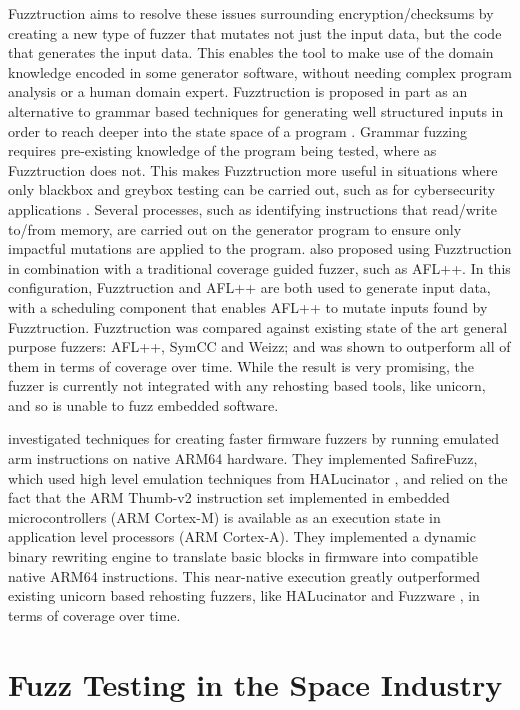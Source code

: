 \documentclass[../report.tex]{subfiles}
\begin{document}
Fuzztruction \citep{Fuzztruction_2023} aims to resolve these issues surrounding
encryption/checksums by creating a new type of fuzzer that mutates not just the
input data, but the code that generates the input data. This enables the tool
to make use of the domain knowledge encoded in some generator software, without
needing complex program analysis or a human domain expert. Fuzztruction is
proposed in part as an alternative to grammar based techniques for generating
well structured inputs in order to reach deeper into the state space of a
program \citep{Fuzztruction_2023}. Grammar fuzzing requires pre-existing
knowledge of the program being tested, where as Fuzztruction does not. This
makes Fuzztruction more useful in situations where only blackbox and greybox
testing can be carried out, such as for cybersecurity applications
\citep{Fuzztruction_2023}. Several processes, such as identifying instructions
that read/write to/from memory, are carried out on the generator program to
ensure only impactful mutations are applied to the program.
\citet{Fuzztruction_2023} also proposed using Fuzztruction in combination with
a traditional coverage guided fuzzer, such as AFL++. In this configuration,
Fuzztruction and AFL++ are both used to generate input data, with a scheduling
component that enables AFL++ to mutate inputs found by Fuzztruction.
Fuzztruction was compared against existing state of the art general purpose
fuzzers: AFL++, SymCC and Weizz; and was shown to outperform all of them in
terms of coverage over time. While the result is very promising, the fuzzer is
currently not integrated with any rehosting based tools, like unicorn, and so
is unable to fuzz embedded software.

\citet{Seidel_2023} investigated techniques for creating faster firmware
fuzzers by running emulated arm instructions on native ARM64 hardware. They
implemented SafireFuzz, which used high level emulation techniques from
HALucinator \citep{HALucinator_2020}, and relied on the fact that the ARM
Thumb-v2 instruction set implemented in embedded microcontrollers (ARM
Cortex-M) is available as an execution state in application level processors
(ARM Cortex-A). They implemented a dynamic binary rewriting engine to translate
basic blocks in firmware into compatible native ARM64 instructions. This
near-native execution greatly outperformed existing unicorn based rehosting
fuzzers, like HALucinator \citep{HALucinator_2020} and Fuzzware
\citep{Fuzzware_2022}, in terms of coverage over time.

\section{Fuzz Testing in the Space Industry}
\end{document}
